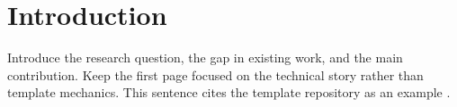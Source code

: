 \section{Introduction}

Introduce the research question, the gap in existing work, and the main
contribution. Keep the first page focused on the technical story rather than
template mechanics. This sentence cites the template repository as an example
\citep{sjtuiicarxivtemplate2026}.
